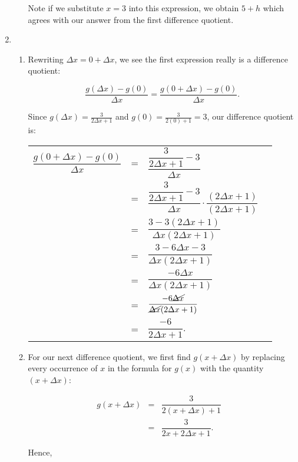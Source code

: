 \begin{ex}
\begin{enumerate}
\begin{enumerate}
Note if we substitute $x=3$ into this expression, we obtain $5+h$ which agrees with our answer from the first difference quotient.

\end{enumerate}

\item 

\begin{enumerate}

\item Rewriting $\Delta x = 0 + \Delta x$, we see the first expression really is a difference quotient:

\[ \dfrac{g(\Delta x)-g(0)}{\Delta x} = \dfrac{g(0+\Delta x)-g(0)}{\Delta x}.\]

Since $g(\Delta x) = \frac{3}{2 \Delta x + 1}$ and $g(0) = \frac{3}{2(0)+1} = 3$, our difference quotient is:

\begin{longtable}{rclr}  

$\dfrac{g(0+\Delta x)-g(0)}{\Delta x}$ & = & $\dfrac{\dfrac{3}{2\Delta x+1}-3}{\Delta x}$ & \\ [10pt]
& = &  $\dfrac{\dfrac{3}{2\Delta x+1}-3}{\Delta x} \cdot \dfrac{(2\Delta x+1)}{(2\Delta x+1)}$ & \\ [10pt]
& = &  $\dfrac{3-3(2\Delta x+1)}{\Delta x(2\Delta x+1)}$  & \\ [10pt]
& = &  $\dfrac{3 - 6 \Delta x - 3}{\Delta x(2\Delta x+1)}$  & \\ [10pt]
& = &  $\dfrac{-6\Delta x}{\Delta x(2\Delta x+1)}$  & \\ [10pt]
& = &  $\dfrac{-6\cancel{\Delta x}}{\cancel{\Delta x}(2\Delta x+1)}$  & \\ [10pt]
& = &  $\dfrac{-6}{2\Delta x+1}$.  & \\ 

\end{longtable}

\item For our next difference quotient, we first find $g(x+\Delta x)$ by replacing every occurrence of $x$ in the formula for $g(x)$ with the quantity $(x+\Delta x)$:

 \[ \begin{array}{rclr}  
 g(x+\Delta x) & = & \dfrac{3}{2(x+\Delta x)+1} & \\
 & = & \dfrac{3}{2x+2\Delta x+1}.
 \end{array} \]

Hence,

\begin{longtable}{rclr}  


\end{longtable}
\end{enumerate}
\end{enumerate}
\end{ex}
